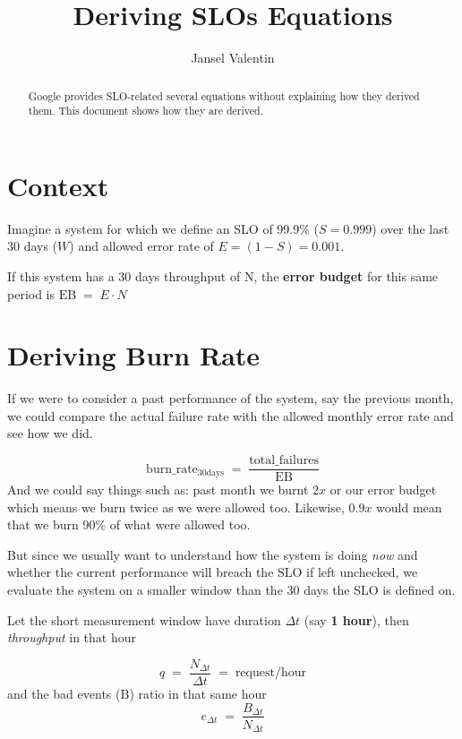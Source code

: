 \documentclass{article}
\title{Deriving SLOs Equations}
\author{Jansel Valentin}
\date{}
\begin{document}
\maketitle

\begin{abstract}
\noindent Google provides SLO-related several equations without explaining how they derived them. This document shows how they are derived.
\end{abstract}

\section*{Context}

Imagine a system for which we define an SLO of 99.9\% ($S = 0.999$) over the last 30 days ($W$) and allowed error rate of $E = (1 - S) = 0.001$.

\quad

\noindent If this system has a 30 days throughput of $\mathrm{N}$, the \textbf{error budget} for this same period is $\mathrm{EB} \;=\; E \cdot N$

\section{Deriving Burn Rate}

If we were to consider a past performance of the system, say the previous month, we could compare the actual failure rate with the allowed monthly error rate and see how we did.

\[
\mathrm{burn\_rate_{30days}} \;=\; \frac{\mathrm{total\_failures}}{\mathrm{EB}}
\]
And we could say things such as: past month we burnt $2x$ or our error budget which means we burn twice as we were allowed too. Likewise, $0.9x$ would mean that we burn 90\% of what were allowed too.

\quad

\noindent But since we usually want to understand how the system is doing \emph{now} and whether the current performance will breach the SLO if left unchecked, we evaluate the system on a smaller window than the 30 days the SLO is defined on.

\quad

Let the short measurement window have duration $\Delta t$ (say \textbf{1 hour}), then \emph{throughput} in that hour

\[
q \;=\; \frac{N_{\Delta t}}{\Delta t} \;=\; \text{request/hour}
\]
and the bad events ($\mathrm{B}$) ratio in that same hour
\[
e_{\Delta t} \;=\; \frac{B_{\Delta t}}{N_{\Delta t}}
\]
\end{document}
